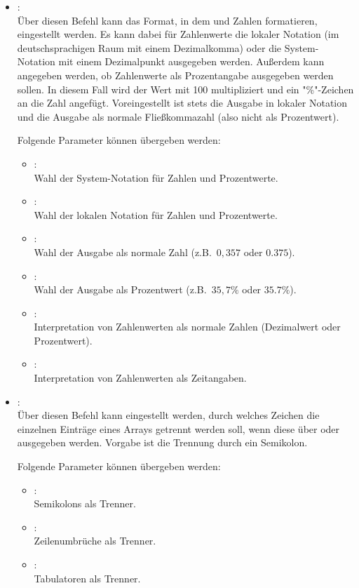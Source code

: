 \begin{itemize}

\item
{}:\\
Über diesen Befehl kann das Format, in dem  und 
Zahlen formatieren, eingestellt werden. Es kann dabei für Zahlenwerte die lokaler Notation (im deutschsprachigen
Raum mit einem Dezimalkomma) oder die System-Notation mit einem Dezimalpunkt ausgegeben werden. Außerdem
kann angegeben werden, ob Zahlenwerte als Prozentangabe ausgegeben werden sollen. In diesem Fall wird
der Wert mit 100 multipliziert und ein "\%"-Zeichen an die Zahl angefügt. Voreingestellt ist stets die
Ausgabe in lokaler Notation und die Ausgabe als normale Fließkommazahl (also nicht als Prozentwert).

Folgende Parameter können  übergeben werden:	
\begin{itemize}
\item
{}:\\
Wahl der System-Notation für Zahlen und Prozentwerte.
\item
{}:\\
Wahl der lokalen Notation für Zahlen und Prozentwerte.
\item
{}:\\
Wahl der Ausgabe als normale Zahl (z.B.\ $0{,}357$ oder $0.375$).
\item
{}:\\
Wahl der Ausgabe als Prozentwert (z.B.\ $35,7\%$ oder $35.7\%$).
\item
{}:\\
Interpretation von Zahlenwerten als normale Zahlen (Dezimalwert oder Prozentwert).
\item
{}:\\
Interpretation von Zahlenwerten als Zeitangaben.

\end{itemize}

\item
{}:\\
Über diesen Befehl kann eingestellt werden, durch welches Zeichen die einzelnen Einträge
eines Arrays getrennt werden soll, wenn diese über  oder
 ausgegeben werden.
Vorgabe ist die Trennung durch ein Semikolon.

Folgende Parameter können  übergeben werden:
\begin{itemize}
\item
{}:\\
Semikolons als Trenner.
\item
{}:\\
Zeilenumbrüche als Trenner.
\item
{}:\\
Tabulatoren als Trenner.
\end{itemize}


\end{itemize}
